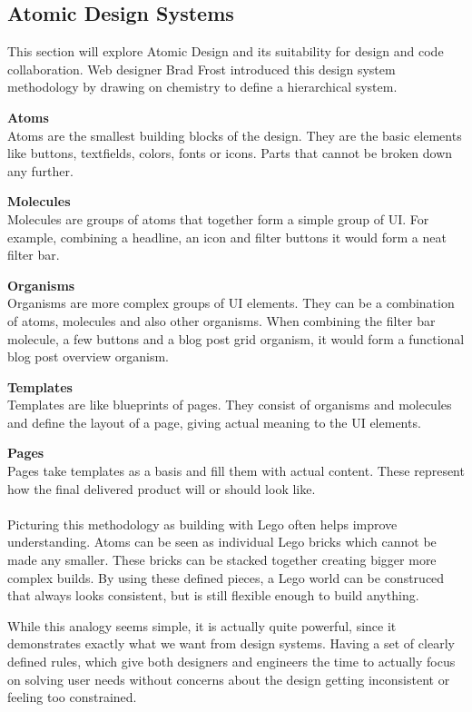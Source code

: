 \newpage
\subsection{Atomic Design Systems} \label{Atomic Design Systems}
This section will explore Atomic Design and its suitability for design and code collaboration. Web
designer Brad Frost introduced this design system methodology by drawing on chemistry to define a
hierarchical system. 

\textbf{Atoms} \\
Atoms are the smallest building blocks of the design. They are the basic elements like buttons,
textfields, colors, fonts or icons. Parts that cannot be broken down any further. 

\textbf{Molecules} \\
Molecules are groups of atoms that together form a simple group of UI. For example, combining
a headline, an icon and filter buttons it would form a neat filter bar. 

\textbf{Organisms} \\
Organisms are more complex groups of UI elements. They can be a combination of atoms, molecules and
also other organisms. When combining the filter bar molecule, a few buttons and a blog post grid
organism, it would form a functional blog post overview organism. 

\textbf{Templates} \\
Templates are like blueprints of pages. They consist of organisms and molecules and define the
layout of a page, giving actual meaning to the UI elements. 

\textbf{Pages}\\
Pages take templates as a basis and fill them with actual content. These represent how the final
delivered product will or should look like. \\
\\

Picturing this methodology as building with Lego often helps improve understanding. Atoms can be
seen as individual Lego bricks which cannot be made any smaller. These bricks can be stacked
together creating bigger more complex builds. By using these defined pieces, a Lego world can be
construced that always looks consistent, but is still flexible enough to build anything.

While this analogy seems simple, it is actually quite powerful, since it demonstrates exactly what
we want from design systems. Having a set of clearly defined rules, which give both designers and
engineers the time to actually focus on solving user needs without concerns about the design
getting inconsistent or feeling too constrained. 

